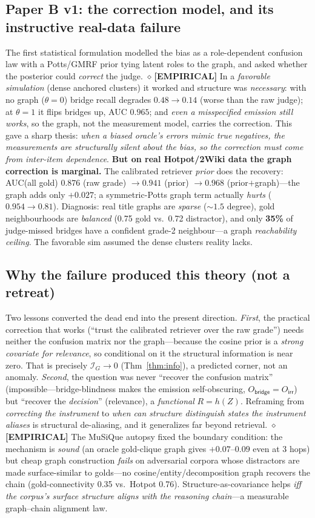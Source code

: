 \documentclass[11pt]{article}
\newcommand{\EVID}[1]{{\color{blue!60!black}\small$\diamond$\,\textbf{[EMPIRICAL]} #1}}
\begin{document}
\subsection{Paper B v1: the correction model, and its instructive real-data failure}
The first statistical formulation modelled the bias as a role-dependent confusion law with a Potts/GMRF prior
tying latent roles to the graph, and asked whether the posterior could \emph{correct} the judge.
\EVID{In a \emph{favorable simulation} (dense anchored clusters) it worked and structure was \emph{necessary}:
with no graph ($\theta{=}0$) bridge recall degrades $0.48\!\to\!0.14$ (worse than the raw judge); at $\theta{=}1$
it flips bridges up, AUC $0.965$; and \emph{even a misspecified emission still works}, so the graph, not the
measurement model, carries the correction. This gave a sharp thesis: \emph{when a biased oracle's errors mimic
true negatives, the measurements are structurally silent about the bias, so the correction must come from
inter-item dependence}. \textbf{But on real Hotpot/2Wiki data the graph correction is marginal.} The calibrated
retriever \emph{prior} does the recovery: AUC(all gold) $0.876$ (raw grade) $\to0.941$ (prior) $\to0.968$
(prior$+$graph)---the graph adds only $+0.027$; a symmetric-Potts graph term actually \emph{hurts}
($0.954\!\to\!0.81$). Diagnosis: real title graphs are \emph{sparse} ($\sim1.5$ degree), gold neighbourhoods are
\emph{balanced} (0.75 gold vs.\ 0.72 distractor), and only \textbf{35\%} of judge-missed bridges have a confident
grade-2 neighbour---a graph \emph{reachability ceiling}. The favorable sim assumed the dense clusters reality
lacks.}

\subsection{Why the failure produced this theory (not a retreat)}
Two lessons converted the dead end into the present direction. \emph{First}, the practical correction that works
(``trust the calibrated retriever over the raw grade'') needs neither the confusion matrix nor the graph---because
the cosine prior is a \emph{strong covariate for relevance}, so conditional on it the structural information is
near zero. That is precisely $\mathcal I_G\!\to\!0$ (Thm~\ref{thm:info}), a predicted corner, not an anomaly.
\emph{Second}, the question was never ``recover the confusion matrix'' (impossible---bridge-blindness makes the
emission self-obscuring, $O_{\textsf{bridge}}=O_{\textsf{irr}}$) but ``recover the \emph{decision}'' (relevance), a
\emph{functional} $R=h(Z)$. Reframing from \emph{correcting the instrument} to \emph{when can structure
distinguish states the instrument aliases} is structural de-aliasing, and it generalizes far beyond retrieval.
\EVID{The MuSiQue autopsy fixed the boundary condition: the mechanism is \emph{sound} (an oracle gold-clique graph
gives $+0.07$--$0.09$ even at 3 hops) but cheap graph construction \emph{fails} on adversarial corpora whose
distractors are made surface-similar to golds---no cosine/entity/decomposition graph recovers the chain
(gold-connectivity 0.35 vs.\ Hotpot 0.76). Structure-as-covariance helps \emph{iff the corpus's surface structure
aligns with the reasoning chain}---a measurable graph--chain alignment law.}
\end{document}
